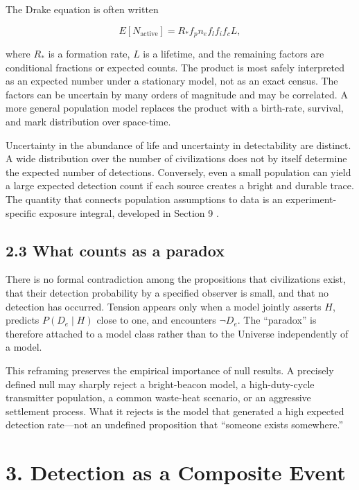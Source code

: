 \documentclass[11pt,a4paper]{article}
\begin{document}
The Drake equation is often written \citep{drake1961,cocconimorrison1959}

\begin{equation}
E[N_{\mathrm{active}}] = R_* f_p n_e f_l f_i f_c L,
\end{equation}

where \(R_*\) is a formation rate, \(L\) is a lifetime, and the remaining factors are conditional fractions or expected counts. The product is most safely interpreted as an expected number under a stationary model, not as an exact census. The factors can be uncertain by many orders of magnitude and may be correlated. A more general population model replaces the product with a birth-rate, survival, and mark distribution over space-time.

Uncertainty in the abundance of life and uncertainty in detectability are distinct. A wide distribution over the number of civilizations does not by itself determine the expected number of detections. Conversely, even a small population can yield a large expected detection count if each source creates a bright and durable trace. The quantity that connects population assumptions to data is an experiment-specific exposure integral, developed in Section 9 \citep{bryson2021,spiegelturner2012,lacki2016,grimaldi2020,grimaldimarcy2018}.

\subsection{2.3 What counts as a paradox}\label{23-what-counts-as-a-paradox}

There is no formal contradiction among the propositions that civilizations exist, that their detection probability by a specified observer is small, and that no detection has occurred. Tension appears only when a model jointly asserts \(H\), predicts \(P(D_e\mid H)\) close to one, and encounters \(\neg D_e\). The ``paradox'' is therefore attached to a model class rather than to the Universe independently of a model.

This reframing preserves the empirical importance of null results. A precisely defined null may sharply reject a bright-beacon model, a high-duty-cycle transmitter population, a common waste-heat scenario, or an aggressive settlement process. What it rejects is the model that generated a high expected detection rate---not an undefined proposition that ``someone exists somewhere.''

\section{3. Detection as a Composite Event}\label{3-detection-as-a-composite-event}
\end{document}
